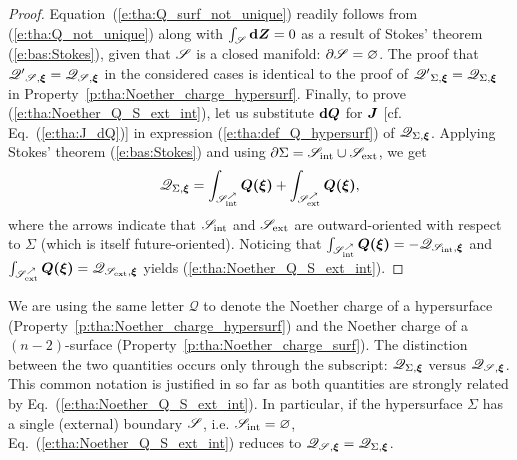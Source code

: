 \begin{proof}
Equation~(\ref{e:tha:Q_surf_not_unique}) readily follows from (\ref{e:tha:Q_not_unique})
along with $\int_{\mathscr{S}} \mathbf{d}\bm{Z} = 0$ as a result of Stokes' theorem (\ref{e:bas:Stokes}),
given that $\mathscr{S}$ is a closed manifold:
$\partial\mathscr{S} = \varnothing$.
The proof that $\mathscr{Q'}_{\mathscr{S},\bm{\xi}} = \mathscr{Q}_{\mathscr{S},\bm{\xi}}$
in the considered cases is identical to the proof of $\mathscr{Q'}_{\Sigma,\bm{\xi}} = \mathscr{Q}_{\Sigma,\bm{\xi}}$
in Property~\ref{p:tha:Noether_charge_hypersurf}.
Finally, to prove (\ref{e:tha:Noether_Q_S_ext_int}),
let us substitute $\mathbf{d}\bm{Q}$ for $\bm{J}$ [cf. Eq.~(\ref{e:tha:J_dQ})]
in expression (\ref{e:tha:def_Q_hypersurf}) of
$\mathscr{Q}_{\Sigma,\bm{\xi}}$. Applying
Stokes' theorem (\ref{e:bas:Stokes}) and using
$\partial\Sigma = \mathscr{S}_{\rm int} \cup \mathscr{S}_{\rm ext}$, we get
\[
    \mathscr{Q}_{\Sigma,\bm{\xi}} = \int_{\mathscr{S}_{\rm int}^\nearrow} \bm{Q}\textbf{(}\bm{\xi}\textbf{)}
    + \int_{\mathscr{S}_{\rm ext}^\nearrow} \bm{Q}\textbf{(}\bm{\xi}\textbf{)} ,
\]
where the arrows indicate that $\mathscr{S}_{\rm int}$ and  $\mathscr{S}_{\rm ext}$
are outward-oriented with respect to $\Sigma$ (which is itself future-oriented).
Noticing that $\int_{\mathscr{S}_{\rm int}^\nearrow} \bm{Q}\textbf{(}\bm{\xi}\textbf{)} = - \mathscr{Q}_{\mathscr{S}_{\rm int},\bm{\xi}}$
and $\int_{\mathscr{S}_{\rm ext}^\nearrow} \bm{Q}\textbf{(}\bm{\xi}\textbf{)} = \mathscr{Q}_{\mathscr{S}_{\rm ext},\bm{\xi}}$
yields (\ref{e:tha:Noether_Q_S_ext_int}).
\end{proof}

\begin{remark}
We are using the same letter $\mathscr{Q}$ to denote the Noether charge of a hypersurface
(Property~\ref{p:tha:Noether_charge_hypersurf}) and the Noether charge of
a $(n-2)$-surface (Property~\ref{p:tha:Noether_charge_surf}). The distinction between the two quantities
occurs only through the subscript: $\mathscr{Q}_{\Sigma,\bm{\xi}}$ versus $\mathscr{Q}_{\mathscr{S},\bm{\xi}}$.
This common notation is justified in so far as both quantities are strongly related by
Eq.~(\ref{e:tha:Noether_Q_S_ext_int}). In particular, if the hypersurface $\Sigma$ has
a single (external) boundary $\mathscr{S}$, i.e. $\mathscr{S}_{\rm int} = \varnothing$, Eq.~(\ref{e:tha:Noether_Q_S_ext_int}) reduces to
$\mathscr{Q}_{\mathscr{S},\bm{\xi}} = \mathscr{Q}_{\Sigma,\bm{\xi}}$.
\end{remark}


